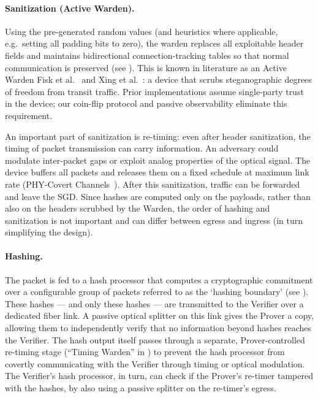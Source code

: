 \documentclass{article}
\begin{document}
\paragraph{Sanitization (Active Warden).} Using the pre-generated random values (and heuristics where applicable, e.g.\ setting all padding bits to zero), the warden replaces all exploitable header fields and maintains bidirectional connection-tracking tables so that normal communication is preserved (see ). This is known in literature as an Active Warden Fisk et al.~\cite{fisk2003eliminating} and Xing et al.~\cite{xing2020netwarden}: a device that scrubs steganographic degrees of freedom from transit traffic. Prior implementations assume single-party trust in the device; our coin-flip protocol and passive observability eliminate this requirement.

An important part of sanitization is re-timing: even after header sanitization, the timing of packet transmission can carry information. An adversary could modulate inter-packet gaps or exploit analog properties of the optical signal. The device buffers all packets and releases them on a fixed schedule at maximum link rate (PHY-Covert Channels~\cite{lee2014phy}). After this sanitization, traffic can be forwarded and leave the SGD. Since hashes are computed only on the payloads, rather than also on the headers scrubbed by the Warden, the order of hashing and sanitization is not important and can differ between egress and ingress (in turn simplifying the design).

\paragraph{Hashing.} The packet is fed to a hash processor that computes a cryptographic commitment over a configurable group of packets referred to as the `hashing boundary' (see ). These hashes --- and only these hashes --- are transmitted to the Verifier over a dedicated fiber link. A passive optical splitter on this link gives the Prover a copy, allowing them to independently verify that no information beyond hashes reaches the Verifier. The hash output itself passes through a separate, Prover-controlled re-timing stage (``Timing Warden'' in ) to prevent the hash processor from covertly communicating with the Verifier through timing or optical modulation. The Verifier's hash processor, in turn, can check if the Prover's re-timer tampered with the hashes, by also using a passive splitter on the re-timer's egress.
\end{document}
